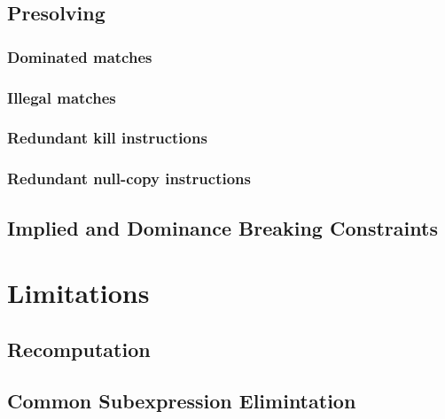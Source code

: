 \subsection{Presolving}
\subsubsection{Dominated matches}
\subsubsection{Illegal matches}
\subsubsection{Redundant kill instructions}
\subsubsection{Redundant null-copy instructions}

\subsection{Implied and Dominance Breaking Constraints}

\section{Limitations}
\subsection{Recomputation}
\subsection{Common Subexpression Elimintation}
